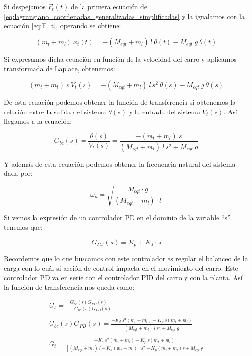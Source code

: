 \documentclass[11pt]{article}
\begin{document}
Si despejamos $F_{t}(t)$ de la primera ecuación de \ref{eq:lagrangiano_coordenadas_generalizadas_simplificadas} y la igualamos con la ecuación \ref{eq:F_t}, operando se obtiene:

\begin{equation}
	\label{eq:F_t_2}
	(m_t+m_l)\ \ddot{x_t}(t)=-(M_{eqt}+m_l)\ l\ \ddot{\theta}(t)-M_{eqt}\ g\ \theta(t)
\end{equation}

Si expresamos dicha ecuación en función de la velocidad del carro y aplicamos transformada de Laplace, obtenemos:

\begin{equation}
	\label{eq:laplace_F_t_2}
	(m_t+m_l)\ s\ V_t(s)=-(M_{eqt}+m_l)\ l\ s^{2}\ \theta(s)-M_{eqt}\ g\ \theta(s)
\end{equation}

De esta ecuación podemos obtener la función de transferencia si obtenemos la relación entre la salida del sistema $\theta(s)$ y la entrada del sistema $V_t(s)$. Así llegamos a la ecuación:

\begin{equation}
	\label{eq:funcion_transferencia}
	G_{bc}(s)=\frac{\theta(s)}{V_t(s)}=\frac{-(m_t+m_l)\ s}{(M_{eqt}+m_l)\ l\ s^{2}+ M_{eqt}\ g}
\end{equation}

Y además de esta ecuación podemos obtener la frecuencia natural del sistema dada por:

\begin{equation}
	\label{eq:frecuencia_natural}
	\omega_{n}=\sqrt{\frac{M_{eqt}\cdot g}{(M_{eqt}+m_l)\cdot l}}
\end{equation}

Si vemos la expresión de un controlador PD en el dominio de la variable ``s'' tenemos que:

\begin{equation}
	\label{eq:controlador_PD}
	G_{PD}(s)=K_p+K_d\cdot s
\end{equation}

Recordemos que lo que buscamos con este controlador es regular el balanceo de la carga con lo cuál si acción de control impacta en el movimiento del carro. Este controlador PD va en serie con el controlador PID del carro y con la planta. Así la función de transferencia nos queda como:

\begin{equation}
	\label{eq:funcion_transferencia_controlador}
	\begin{matrix}G_t=\frac{G_{bc}(s)G_{PD}(s)}{1+G_{bc}(s)G_{PD}(s)}\\\\G_{bc}(s)G_{PD}(s)=\frac{-K_d\:s^{2}(m_t+m_l)-K_p\:s(m_t+m_l)}{(M_{eqt}+m_l)\:l\:s^{2}+M_{eqt}\:g}\\ \\G_t=\frac{-K_d\:s^{2}(m_t+m_l)-K_p\:s(m_t+m_l)}{\left [ (M_{eqt}+m_l)\:l-K_d(m_t+m_l) \right ]s^{2}-K_p(m_t+m_l)s+M_{eqt}\:g}\end{matrix}
\end{equation}
\end{document}
